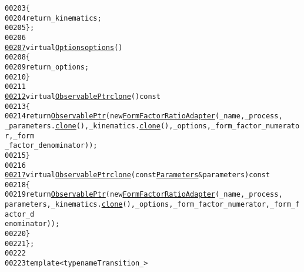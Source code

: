 \begin{footnotesize}
\begin{alltt}
00203             \{
00204                 \textcolor{keywordflow}{return} \_kinematics;
00205             \};
00206 
\hypertarget{form-factor-adapter_8hh_source_l00207}{}\hyperlink{classeos_1_1FormFactorRatioAdapter_a4fe52226955dacc174be74224d8b627b}{00207}             \textcolor{keyword}{virtual} \hyperlink{classeos_1_1Options}{Options} \hyperlink{classeos_1_1FormFactorRatioAdapter_a4fe52226955dacc174be74224d8b627b}{options}()
00208             \{
00209                 \textcolor{keywordflow}{return} \_options;
00210             \}
00211 
\hypertarget{form-factor-adapter_8hh_source_l00212}{}\hyperlink{classeos_1_1FormFactorRatioAdapter_ab5c4a8094db5ac8fc3860afc4a4087b0}{00212}             \textcolor{keyword}{virtual} \hyperlink{namespaceeos_a470e5dd806bd129080f1aa0c2954646f}{ObservablePtr} \hyperlink{classeos_1_1FormFactorRatioAdapter_ab5c4a8094db5ac8fc3860afc4a4087b0}{clone}()\textcolor{keyword}{ const}
00213 \textcolor{keyword}{            }\{
00214                 \textcolor{keywordflow}{return} \hyperlink{namespaceeos_a470e5dd806bd129080f1aa0c2954646f}{ObservablePtr}(\textcolor{keyword}{new} \hyperlink{classeos_1_1FormFactorRatioAdapter_aabe5ff6acb4c2411a9dcc17b0c8058db}{FormFactorRatioAdapter}(\_name, \_process, 
      \_parameters.\hyperlink{classeos_1_1Parameters_a273f5bad065bc47b62981734a2e3576e}{clone}(), \_kinematics.\hyperlink{classeos_1_1Kinematics_aedd9681136ab3735fb754e2840e10715}{clone}(), \_options, \_form\_factor\_numerator, \_form
      \_factor\_denominator));
00215             \}
00216 
\hypertarget{form-factor-adapter_8hh_source_l00217}{}\hyperlink{classeos_1_1FormFactorRatioAdapter_ad8de46a9cedc903bfe0beecbbf66dc58}{00217}             \textcolor{keyword}{virtual} \hyperlink{namespaceeos_a470e5dd806bd129080f1aa0c2954646f}{ObservablePtr} \hyperlink{classeos_1_1FormFactorRatioAdapter_ab5c4a8094db5ac8fc3860afc4a4087b0}{clone}(\textcolor{keyword}{const} \hyperlink{classeos_1_1Parameters}{Parameters} & parameters)\textcolor{keyword}{ const}
00218 \textcolor{keyword}{            }\{
00219                 \textcolor{keywordflow}{return} \hyperlink{namespaceeos_a470e5dd806bd129080f1aa0c2954646f}{ObservablePtr}(\textcolor{keyword}{new} \hyperlink{classeos_1_1FormFactorRatioAdapter_aabe5ff6acb4c2411a9dcc17b0c8058db}{FormFactorRatioAdapter}(\_name, \_process, 
      parameters, \_kinematics.\hyperlink{classeos_1_1Kinematics_aedd9681136ab3735fb754e2840e10715}{clone}(), \_options, \_form\_factor\_numerator, \_form\_factor\_d
      enominator));
00220             \}
00221     \};
00222 
00223     \textcolor{keyword}{template} <\textcolor{keyword}{typename} Transition\_>

\end{alltt}
\end{footnotesize}

